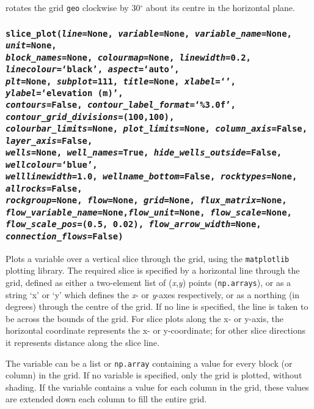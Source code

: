 rotates the grid \texttt{geo} clockwise by 30$^{\circ}$ about its centre in the horizontal plane.

\subsubsection{\texttt{slice\_plot(\emph{line}=None, \emph{variable}=None, \emph{variable\_name}=None, \emph{unit}=None,\\
    \emph{block\_names}=None, \emph{colourmap}=None, \emph{linewidth}=0.2, \emph{linecolour}=`black', \emph{aspect}=`auto',\\
    \emph{plt}=None, \emph{subplot}=111, \emph{title}=None, \emph{xlabel}=`', \emph{ylabel}=`elevation (m)',\\
    \emph{contours}=False, \emph{contour\_label\_format}=`\%3.0f', \emph{contour\_grid\_divisions}=(100,100),\\
    \emph{colourbar\_limits}=None, \emph{plot\_limits}=None, \emph{column\_axis}=False, \emph{layer\_axis}=False,\\
    \emph{wells}=None, \emph{well\_names}=True, \emph{hide\_wells\_outside}=False, \emph{wellcolour}=`blue',\\
    \emph{welllinewidth}=1.0, \emph{wellname\_bottom}=False, \emph{rocktypes}=None, \emph{allrocks}=False, \\
    \emph{rockgroup}=None, \emph{flow}=None, \emph{grid}=None, \emph{flux\_matrix}=None, \\
    \emph{flow\_variable\_name}=None,\emph{flow\_unit}=None, \emph{flow\_scale}=None, \\
    \emph{flow\_scale\_pos}=(0.5, 0.02), \emph{flow\_arrow\_width}=None, \emph{connection\_flows}=False)}}
\label{sec:slice_plot}

Plots a variable over a vertical slice through the grid, using the \texttt{matplotlib} plotting library.  The required slice is specified by a horizontal line through the grid, defined as either a two-element list of (\emph{x},\emph{y}) points (\texttt{np.arrays}), or as a string `x' or `y' which defines the \emph{x}- or \emph{y}-axes respectively, or as a northing (in degrees) through the centre of the grid.  If no line is specified, the line is taken to be across the bounds of the grid.  For slice plots along the x- or y-axis, the horizontal coordinate represents the x- or y-coordinate; for other slice directions it represents distance along the slice line.

The variable can be a list or \texttt{np.array} containing a value for every block (or column) in the grid.  If no variable is specified, only the grid is plotted, without shading.  If the variable contains a value for each column in the grid, these values are extended down each column to fill the entire grid.

